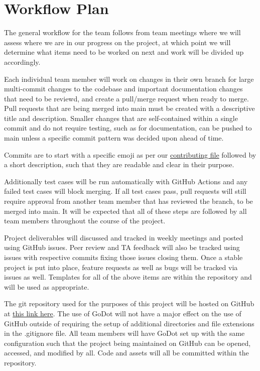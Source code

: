 \documentclass{article}
\begin{document}
\newpage
\section{Workflow Plan}

The general workflow for the team follows from team meetings where we will assess where we are in our progress on the project, at which point we will determine what items need to be worked on next and work will be divided up accordingly.

Each individual team member will work on changes in their own branch for large multi-commit changes to the codebase and important documentation changes that need to be reviewd, and create a pull/merge request when ready to merge. Pull requests that are being merged into main must be created with a descriptive title and description. Smaller changes that are self-contained within a single commit and do not require testing, such as for documentation, can be pushed to main unless a specific commit pattern was decided upon ahead of time.

Commits are to start with a specific emoji as per our \href{https://github.com/John-Popovici/duel-of-the-eights/blob/main/CONTRIBUTING.md}{contributing file} followed by a short description, such that they are readable and clear in their purpose.

Additionally test cases will be run automatically with GitHub Actions and any failed test cases will block merging. If all test cases pass, pull requests will still require approval from another team member that has reviewed the branch, to be merged into main. It will be expected that all of these steps are followed by all team members throughout the course of the project.

Project deliverables will discussed and tracked in weekly meetings and posted using GitHub issues. Peer review and TA feedback will also be tracked using issues with respective commits fixing those issues closing them. Once a stable project is put into place, feature requests as well as bugs will be tracked via issues as well. Templates for all of the above items are within the repository and will be used as appropriate.

The git repository used for the purposes of this project will be hosted on GitHub at  \href{https://github.com/John-Popovici/duel-of-the-eights.git}{this link here}. The use of GoDot will not have a major effect on the use of GitHub outside of requiring the setup of additional directories and file extensions in the .gitignore file. All team members will have GoDot set up with the same configuration such that the project being maintained on GitHub can be opened, accessed, and modified by all. Code and assets will all be committed within the repository.\newline
\end{document}
